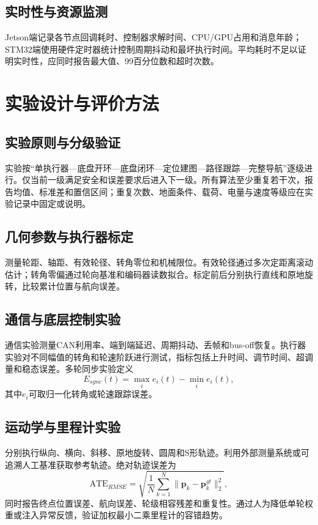 \documentclass[UTF8,openany,12pt,a4paper]{ctexrep}
\begin{document}
\section{实时性与资源监测}
Jetson端记录各节点回调耗时、控制器求解时间、CPU/GPU占用和消息年龄；STM32端使用硬件定时器统计控制周期抖动和最坏执行时间。平均耗时不足以证明实时性，应同时报告最大值、99百分位数和超时次数。

\chapter{实验设计与评价方法}
\section{实验原则与分级验证}
实验按“单执行器—底盘开环—底盘闭环—定位建图—路径跟踪—完整导航”逐级进行。仅当前一级满足安全和误差要求后进入下一级。所有算法至少重复若干次，报告均值、标准差和置信区间；重复次数、地面条件、载荷、电量与速度等级应在实验记录中固定或说明。

\section{几何参数与执行器标定}
测量轮距、轴距、有效轮径、转角零位和机械限位。有效轮径通过多次定距离滚动估计；转角零偏通过轮向基准和编码器读数拟合。标定前后分别执行直线和原地旋转，比较累计位置与航向误差。

\section{通信与底层控制实验}
通信实验测量CAN利用率、端到端延迟、周期抖动、丢帧和bus-off恢复。执行器实验对不同幅值的转角和轮速阶跃进行测试，指标包括上升时间、调节时间、超调量和稳态误差。多轮同步实验定义
\begin{equation}E_{sync}(t)=\max_i e_i(t)-\min_i e_i(t),\end{equation}
其中$e_i$可取归一化转角或轮速跟踪误差。

\section{运动学与里程计实验}
分别执行纵向、横向、斜移、原地旋转、圆周和S形轨迹。利用外部测量系统或可追溯人工基准获取参考轨迹。绝对轨迹误差为
\begin{equation}
\mathrm{ATE}_{RMSE}=\sqrt{\frac{1}{N}\sum_{k=1}^{N}\|\bm p_k-\bm p_k^{gt}\|_2^2},
\end{equation}
同时报告终点位置误差、航向误差、轮级相容残差和重复性。通过人为降低单轮权重或注入异常反馈，验证加权最小二乘里程计的容错趋势。
\end{document}
